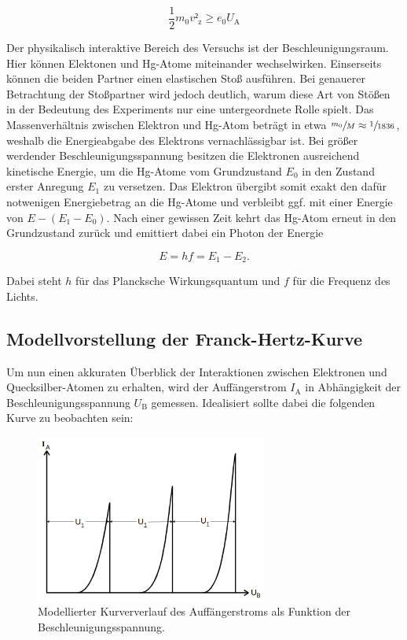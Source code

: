 \begin{equation*}
    \frac{1}{2}m_0v²_\text{z} \geq e_0U_\text{A}
\end{equation*}

\noindent Der physikalisch interaktive Bereich des Versuchs ist der Beschleunigungsraum. Hier können Elektonen und Hg-Atome miteinander wechselwirken.
Einserseits können die beiden Partner einen elastischen Stoß ausführen. Bei genauerer Betrachtung der Stoßpartner wird jedoch deutlich, warum diese Art von 
Stößen in der Bedeutung des Experiments nur eine untergeordnete Rolle spielt. Das Massenverhältnis zwischen Elektron und Hg-Atom beträgt in etwa 
$\sfrac{m_0}{M} \approx \sfrac{1}{1836}$, weshalb die Energieabgabe des Elektrons vernachlässigbar ist. Bei größer werdender Beschleunigungsspannung besitzen 
die Elektronen ausreichend kinetische Energie, um die Hg-Atome vom Grundzustand $E_0$ in den Zustand erster Anregung $E_1$ zu versetzen. Das Elektron übergibt 
somit exakt den dafür notwenigen Energiebetrag an die Hg-Atome und verbleibt ggf. mit einer Energie von $E - \left(E_1 - E_0\right)$. Nach einer gewissen
Zeit kehrt das Hg-Atom erneut in den Grundzustand zurück und emittiert dabei ein Photon der Energie 

\begin{equation*}
    E = hf = E_1 - E_2. 
\end{equation*}

\noindent Dabei steht $h$ für das Plancksche Wirkungsquantum und $f$ für die Frequenz des Lichts.\\

\subsection{Modellvorstellung der Franck-Hertz-Kurve}
\label{sec:Modellvorstellung}

\noindent Um nun einen akkuraten Überblick der Interaktionen zwischen Elektronen und Quecksilber-Atomen zu erhalten, wird der Auffängerstrom $I_\text{A}$
in Abhängigkeit der Beschleunigungsspannung $U_\text{B}$ gemessen. Idealisiert sollte dabei die folgenden Kurve zu beobachten sein:

\begin{figure}
    \centering
    \includegraphics[height=5.5cm]{content/FH_Modellkurve.png}
    \caption{Modellierter Kurververlauf des Auffängerstroms als Funktion der Beschleunigungsspannung\cite{Versuchsanleitung_v601}.}
    \label{fig:FH_Modellkurve}
\end{figure}

